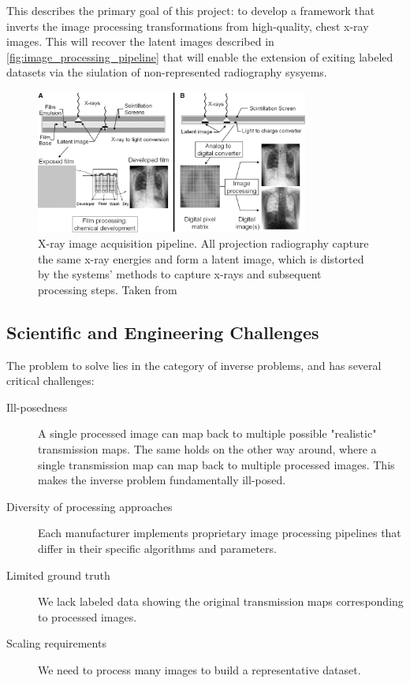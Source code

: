 \documentclass[nomenclature, english, bibtex]{kththesis}
\numberwithin{listing}{chapter}
\begin{document}
This describes the primary goal of this project: to develop a framework that inverts the image processing transformations
from high-quality, chest x-ray images. This will recover the latent images described in \autoref{fig:image_processing_pipeline}
that will enable the extension of exiting labeled datasets via the siulation of non-represented radiography sysyems.

\begin{figure}
    \centering
    \includegraphics[width=0.8\textwidth]{figures/latent_image.jpg}
    \caption{X-ray image acquisition pipeline. All projection radiography capture the same x-ray energies and
   form a latent image, which is distorted by the systems' methods to capture x-rays and subsequent processing steps.
    Taken from \cite[p.~13]{Seibert3}}
    \label{fig:image_processing_pipeline}
\end{figure}

\subsection{Scientific and Engineering Challenges}

The problem to solve lies in the category of inverse problems, and has several critical challenges:

\begin{description}
    \item[Ill-posedness]
        A single processed image can map back to multiple possible "realistic" transmission maps.
        The same holds on the other way around, where a single transmission map can map back to multiple processed images.
       This makes the inverse problem fundamentally ill-posed.
    \item[Diversity of processing approaches]
        Each manufacturer implements proprietary image processing pipelines that differ in their specific algorithms and parameters.
    \item[Limited ground truth] We lack labeled data showing the original transmission maps corresponding to processed images.
    \item[Scaling requirements] We need to process many images to build a representative dataset.
\end{description}
\end{document}
